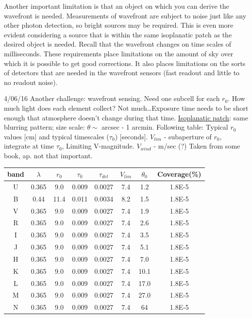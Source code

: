 \documentclass[12pt]{article}
\newcommand{\mynotes}[1]{\textcolor{myBlue}{#1}}
\begin{document}
Another important limitation is that an object on which you can derive the
wavefront is needed. Measurements of wavefront are subject to noise just like
any other photon detection, so bright sources may be required. This is even
more evident considering a source that is within the same isoplanatic patch as
the desired object is needed. Recall that the wavefront changes on time scales
of milliseconds. These requirements place limitations on the amount of sky over
which it is possible to get good corrections. It also places limitations on the
sorts of detectors that are needed in the wavefront sensors (fast readout and
little to no readout noise).

\mynotes{4/06/16 Another challenge: wavefront sensing. Need one subcell for
each $r_{0}$. How much light does each element collect? Not much\ldots Exposure
time needs to be short enough that atmosphere doesn't change during that time.
\underline{Isoplanatic patch}: same blurring pattern; size scale: $\theta \sim$
arcsec - 1 arcmin. Following table: Typical $r_{0}$ values [cm] and typical
timescales ($\tau_{0}$) [seconds]. $V_{lim}$ - subaperture of $r_{0}$,
integrate at time $\tau_{0}$, Limiting V-magnitude. $V_{wind}$ - m/sec (?)
Taken from some book, ap. not that important. }

\begin{table}[th]
\centering
\begin{tabular}{c c c c c c c c}
    band & $\lambda$ & $r_0$ & $\tau_0$ & $\tau_{det}$ & $V_{lim}$ &
    $\theta_0$ & Coverage(\%)\\
    \hline\hline
    U & 0.365 & 9.0 & 0.009 & 0.0027 & 7.4 & 1.2 & 1.8E-5\\
    B & 0.44 & 11.4 & 0.011 & 0.0034 & 8.2 & 1.5 & 1.8E-5\\
    V & 0.365 & 9.0 & 0.009 & 0.0027 & 7.4 & 1.9 & 1.8E-5\\
    R & 0.365 & 9.0 & 0.009 & 0.0027 & 7.4 & 2.6 & 1.8E-5\\
    I & 0.365 & 9.0 & 0.009 & 0.0027 & 7.4 & 3.5 & 1.8E-5\\
    J & 0.365 & 9.0 & 0.009 & 0.0027 & 7.4 & 5.1 & 1.8E-5\\
    H & 0.365 & 9.0 & 0.009 & 0.0027 & 7.4 & 7.0 & 1.8E-5\\
    K & 0.365 & 9.0 & 0.009 & 0.0027 & 7.4 & 10.1 & 1.8E-5\\
    L & 0.365 & 9.0 & 0.009 & 0.0027 & 7.4 & 17.0 & 1.8E-5\\
    M & 0.365 & 9.0 & 0.009 & 0.0027 & 7.4 & 27.0 & 1.8E-5\\
    N & 0.365 & 9.0 & 0.009 & 0.0027 & 7.4 & 64 & 1.8E-5\\
    \hline
    \end{tabular}
\end{table}
\end{document}
